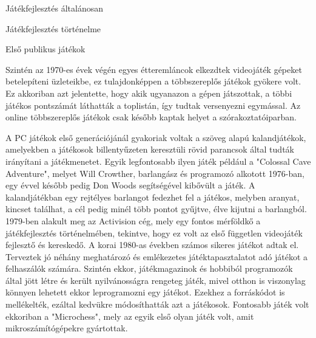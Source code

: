 \begin{MyChapter}{Játékfejlesztés általánosan}
\begin{MySection}{Játékfejlesztés történelme}
\begin{MySubSection}{Első publikus játékok}
		
		Szintén az 1970-es évek végén egyes étteremláncok elkezdtek videojáték gépeket betelepíteni üzleteikbe, ez tulajdonképpen a többszereplős játékok gyökere volt. Ez akkoriban azt jelentette, hogy akik ugyanazon a gépen játszottak, a többi játékos pontszámát láthatták a toplistán, így tudtak versenyezni egymással. Az online többszereplős játékok csak később kaptak helyet a szórakoztatóiparban.
		
		A PC játékok első generációjánál gyakoriak voltak a szöveg alapú kalandjátékok, amelyekben a játékosok billentyűzeten keresztüli rövid parancsok által tudták irányítani a játékmenetet. Egyik legfontosabb ilyen játék például a "Colossal Cave Adventure", melyet Will Crowther, barlangász és programozó alkotott 1976-ban, egy évvel később pedig Don Woods segítségével kibővült a játék. A kalandjátékban egy rejtélyes barlangot fedezhet fel a játékos, melyben aranyat, kincset találhat, a cél pedig minél több pontot gyűjtve, élve kijutni a barlangból.
		1979-ben alakult meg az Activision cég, mely egy fontos mérföldkő a játékfejlesztés történelmében, tekintve, hogy ez volt az első független videojáték fejlesztő és kereskedő. A korai 1980-as években számos sikeres játékot adtak el. Terveztek jó néhány meghatározó és emlékezetes játéktapasztalatot adó játékot a felhaszálók számára.
		Szintén ekkor, játékmagazinok és hobbiból programozók által jött létre és került nyilvánosságra rengeteg játék, mivel otthon is viszonylag könnyen lehetett ekkor leprogramozni egy játékot. Ezekhez a forráskódot is mellékelték, ezáltal kedvükre módosíthatták azt a játékosok. Fontosabb játék volt ekkoriban a "Microchess", mely az egyik első olyan játék volt, amit mikroszámítógépekre gyártottak.
		\end{MySubSection}
		

\end{MySection}
\end{MyChapter}

